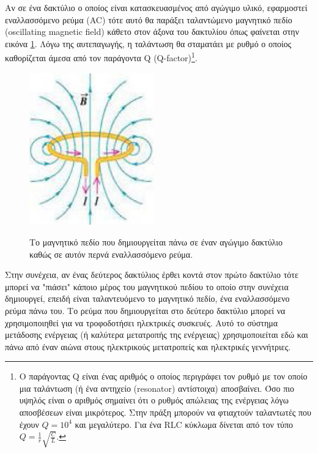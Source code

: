 Αν σε ένα δακτύλιο ο οποίος είναι κατασκευασμένος από αγώγιμο υλικό, εφαρμοστεί εναλλασσόμενο ρεύμα (AC) τότε αυτό θα παράξει ταλαντώμενο μαγνητικό πεδίο (oscillating
magnetic field) κάθετο στον άξονα του δακτυλίου όπως φαίνεται στην εικόνα \ref{fig:magnetic_field}. Λόγω της αυτεπαγωγής, η ταλάντωση θα σταματάει με ρυθμό ο
οποίος καθορίζεται άμεσα από τον παράγοντα Q (Q-factor)\footnote{Ο παράγοντας Q είναι ένας αριθμός ο οποίος περιγράφει τον ρυθμό με τον οποίο μια ταλάντωση (ή ένα
αντηχείο (resonator) αντίστοιχα) αποσβαίνει. Όσο πιο υψηλός είναι ο αριθμός σημαίνει ότι ο ρυθμός απώλειας της ενέργειας λόγω αποσβέσεων είναι μικρότερος. Στην
πράξη μπορούν να φτιαχτούν ταλαντωτές που έχουν $Q=10^{4}$ και μεγαλύτερο. Για ένα RLC κύκλωμα δίνεται από τον τύπο $Q=\frac{1}{r}\sqrt{\frac{C}{L}}$.}.
\begin{figure}
  \vspace{-20pt}
  \begin{center}
  \includegraphics[width=0.48\textwidth]{images/inductive_ring.jpg}\label{fig:magnetic_field}
  \end{center}
  \vspace{-20pt}
  \caption{Το μαγνητικό πεδίο που δημιουργείται πάνω σε έναν αγώγιμο δακτύλιο καθώς σε αυτόν περνά εναλλασσόμενο ρεύμα.}
  \vspace{-10pt}
\end{figure}
Στην συνέχεια, αν ένας δεύτερος δακτύλιος έρθει κοντά στον πρώτο δακτύλιο τότε μπορεί να "πιάσει" κάποιο μέρος του μαγνητικού πεδίου το οποίο στην συνέχεια
δημιουργεί, επειδή είναι ταλαντευόμενο το μαγνητικό πεδίο, ένα εναλλασσόμενο ρεύμα πάνω του. Το ρεύμα που δημιουργείται στο δεύτερο δακτύλιο μπορεί να χρησιμοποιηθεί
για να τροφοδοτήσει ηλεκτρικές συσκευές.  Αυτό το σύστημα μετάδοσης ενέργειας (ή καλύτερα μετατροπής της ενέργειας) χρησιμοποιείται εδώ και πάνω από έναν αιώνα στους
ηλεκτρικούς μετατροπείς και ηλεκτρικές γεννήτριες.

